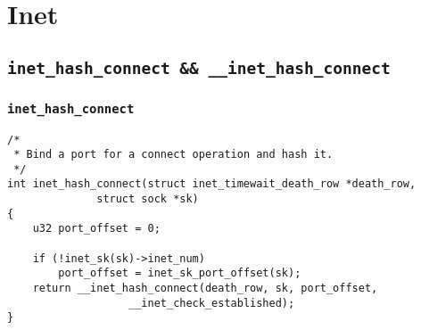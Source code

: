    \section{Inet}
        \subsection{\texttt{inet_hash_connect && __inet_hash_connect}}

           \subsubsection{\texttt{inet_hash_connect}}
\begin{verbatim}
/*
 * Bind a port for a connect operation and hash it.
 */
int inet_hash_connect(struct inet_timewait_death_row *death_row,
              struct sock *sk)
{
    u32 port_offset = 0;

    if (!inet_sk(sk)->inet_num)
        port_offset = inet_sk_port_offset(sk);
    return __inet_hash_connect(death_row, sk, port_offset,
                   __inet_check_established);
}
\end{verbatim}

